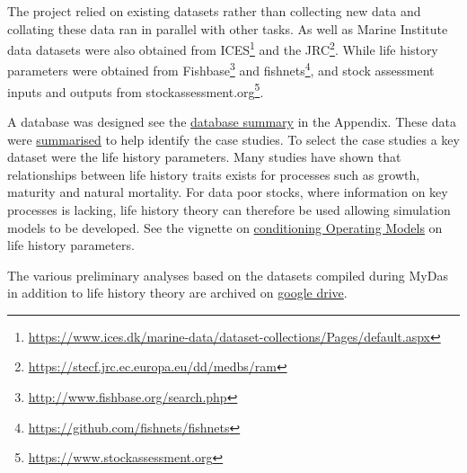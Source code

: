 The project relied on existing datasets rather than collecting new data and collating these data ran in parallel with other tasks. As well as Marine Institute data datasets were also obtained from ICES\footnote{\url{https://www.ices.dk/marine-data/dataset-collections/Pages/default.aspx}} and the JRC\footnote{\url{https://stecf.jrc.ec.europa.eu/dd/medbs/ram}}. While life history parameters were obtained from Fishbase\footnote{\url{http://www.fishbase.org/search.php}} and fishnets\footnote{\url{https://github.com/fishnets/fishnets}}, and stock assessment inputs and outputs from stockassessment.org\footnote{\url{https://www.stockassessment.org}}.

A database was designed see the \hyperref[appendix:db]{database summary} in the Appendix. These data were \href{https://3o2y9wugzp1kfxr5hvzgzq-on.drv.tw/MyDas/tasks/1/stockprioritisation.nb.html}{summarised} to help identify the case studies. To select the case studies a key dataset were the life history parameters. Many studies have shown that relationships between life history traits exists for processes such as growth, maturity and natural mortality. For data poor stocks, where information on key processes is lacking, life history theory can therefore be used allowing simulation models to be developed.  See the vignette on \href{https://3o2y9wugzp1kfxr5hvzgzq-on.drv.tw/MyDas/vignettes/mydas_conditioning.html}{conditioning Operating Models} on life history parameters. 

The various preliminary analyses based on the datasets compiled during MyDas in addition to life history theory are archived on \href{https://drive.google.com/open?id=1rR917GQhDm_b9bzCCxorwBAWvaTVDbix}{google drive}.


